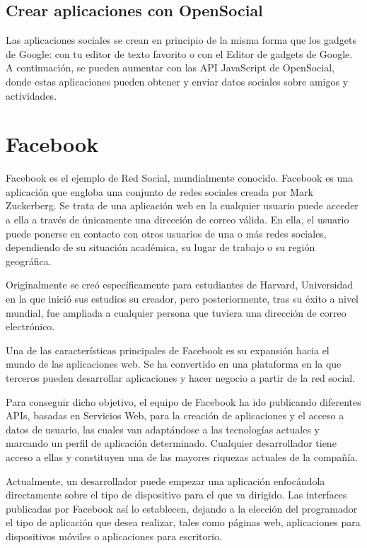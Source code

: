 \subsection{Crear aplicaciones con OpenSocial}
Las aplicaciones sociales se crean en principio de la misma forma que los gadgets de Google: con tu editor de texto favorito o con el Editor de gadgets de Google. A continuación, se pueden aumentar con las API JavaScript de OpenSocial, donde estas aplicaciones pueden obtener y enviar datos sociales sobre amigos y actividades.

\section{Facebook}
Facebook es el ejemplo de Red Social, mundialmente conocido. Facebook es una aplicación que engloba una conjunto de redes sociales creada por
Mark Zuckerberg. Se trata de una aplicación web en la cualquier usuario puede acceder a ella a través de únicamente una dirección de correo válida. En ella, el usuario puede ponerse en contacto con otros usuarios de una o más redes sociales, dependiendo de su situación académica, su lugar de trabajo o su región geográfica.
\bigskip
\par
Originalmente se creó específicamente para estudiantes de Harvard, Universidad en la que inició sus estudios su creador, pero posteriormente, tras su éxito a nivel mundial, fue ampliada a cualquier persona que tuviera una dirección de correo electrónico.
\bigskip
\par
Una de las características principales de Facebook es su expansión hacia el mundo de las aplicaciones web. Se ha convertido en una plataforma en la que terceros pueden desarrollar aplicaciones y hacer negocio a partir de la red social.
\bigskip
\par
Para conseguir dicho objetivo, el equipo de Facebook ha ido publicando diferentes APIs, basadas en Servicios Web, para la creación de aplicaciones y el acceso a datos de usuario, las cuales van adaptándose a las tecnologías actuales y marcando un perfil de aplicación determinado. Cualquier desarrollador tiene acceso a ellas y constituyen una de las mayores riquezas actuales de la compañía.
\bigskip
\par
Actualmente, un desarrollador puede empezar una aplicación enfocándola directamente sobre el tipo de dispositivo para el que va dirigido. Las interfaces
publicadas por Facebook así lo establecen, dejando a la elección del programador el tipo de aplicación que desea realizar, tales como páginas web, aplicaciones para dispositivos móviles o aplicaciones para escritorio.
